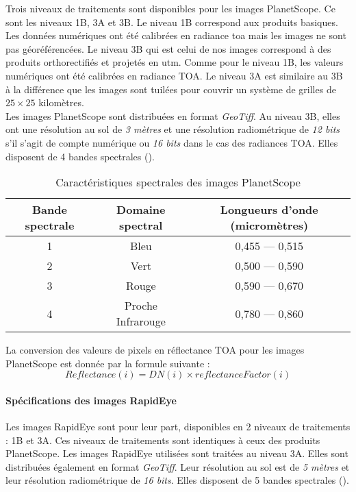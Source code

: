 Trois niveaux de traitements sont disponibles pour les images PlanetScope. Ce sont les niveaux 1B, 3A et 3B. Le niveau 1B correspond aux produits basiques. Les données numériques ont 
été calibrées en radiance \acrshort{toa} mais les images ne sont pas géoréférencées. Le niveau 3B qui est celui de nos images correspond à des produits orthorectifiés et projetés en
\acrshort{utm}. Comme pour le niveau 1B, les valeurs numériques ont été calibrées en radiance TOA. Le niveau 3A est similaire au 3B à la différence que les images sont tuilées pour 
couvrir un système de grilles de $25\times25$ kilomètres.\\
Les images PlanetScope sont distribuées en format \emph{GeoTiff}. Au niveau 3B, elles ont une résolution au sol de \emph{3 mètres} et une résolution radiométrique de \emph{12 bits} s'il 
s'agit de compte numérique ou \emph{16 bits} dans le cas des radiances TOA. Elles disposent de 4 bandes spectrales (). 

\begin{table}
\begin{center}
\caption{Caractéristiques spectrales des images PlanetScope}
\label{planetscope}
 \begin{tabular}{ccc}
  \hline
  Bande spectrale & Domaine spectral & Longueurs d'onde (micromètres)\\
  \hline
  1 & Bleu & 0,455 --- 0,515 \\
  2 & Vert & 0,500 --- 0,590 \\
  3 & Rouge & 0,590 --- 0,670 \\
  4 & Proche Infrarouge & 0,780 --- 0,860 \\ 
  \hline
 \end{tabular}
\end{center}
\end{table}

La conversion des valeurs de pixels en réflectance TOA pour les images PlanetScope est donnée par la formule suivante :
\[
   Reflectance (i) = DN(i) \times reflectanceFactor(i)
\]

  \paragraph{Spécifications des images RapidEye}

Les images RapidEye sont pour leur part, disponibles en 2 niveaux de traitements : 1B et 3A. Ces niveaux de traitements sont identiques à ceux des produits PlanetScope. Les images
RapidEye utilisées sont traitées au niveau 3A. Elles sont distribuées également en format \emph{GeoTiff}. Leur résolution au sol est de \emph{5 mètres} et leur résolution 
radiométrique de \emph{16 bits}. Elles disposent de 5 bandes spectrales ().

